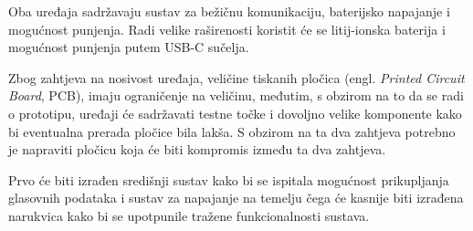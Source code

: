 Oba uređaja sadržavaju sustav za bežičnu komunikaciju, baterijsko napajanje i mogućnost punjenja. Radi velike raširenosti koristit će se litij-ionska baterija i mogućnost punjenja putem USB-C sučelja.

Zbog zahtjeva na nosivost uređaja, veličine tiskanih pločica (engl. \textit{Printed Circuit Board}, PCB), imaju ograničenje na veličinu, međutim, s obzirom na to da se radi o prototipu, uređaji će sadržavati testne točke i dovoljno velike komponente kako bi eventualna prerada pločice bila lakša. S obzirom na ta dva zahtjeva potrebno je napraviti pločicu koja će biti kompromis između ta dva zahtjeva.

Prvo će biti izrađen središnji sustav kako bi se ispitala mogućnost prikupljanja glasovnih podataka i sustav za napajanje na temelju čega će kasnije biti izrađena narukvica kako bi se upotpunile tražene funkcionalnosti sustava.